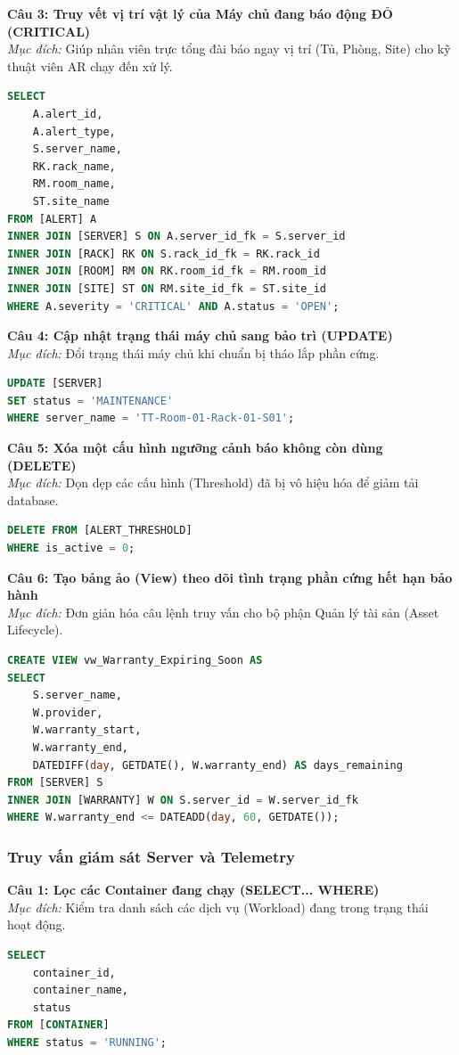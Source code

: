 \noindent \textbf{Câu 3: Truy vết vị trí vật lý của Máy chủ đang báo động ĐỎ (CRITICAL)} \\
\textit{Mục đích:} Giúp nhân viên trực tổng đài báo ngay vị trí (Tủ, Phòng, Site) cho kỹ thuật viên AR chạy đến xử lý.
\begin{lstlisting}[language=SQL]
SELECT
    A.alert_id,
    A.alert_type,
    S.server_name,
    RK.rack_name,
    RM.room_name,
    ST.site_name
FROM [ALERT] A
INNER JOIN [SERVER] S ON A.server_id_fk = S.server_id
INNER JOIN [RACK] RK ON S.rack_id_fk = RK.rack_id
INNER JOIN [ROOM] RM ON RK.room_id_fk = RM.room_id
INNER JOIN [SITE] ST ON RM.site_id_fk = ST.site_id
WHERE A.severity = 'CRITICAL' AND A.status = 'OPEN';
\end{lstlisting}

\noindent \textbf{Câu 4: Cập nhật trạng thái máy chủ sang bảo trì (UPDATE)} \\
\textit{Mục đích:} Đổi trạng thái máy chủ khi chuẩn bị tháo lắp phần cứng.
\begin{lstlisting}[language=SQL]
UPDATE [SERVER]
SET status = 'MAINTENANCE'
WHERE server_name = 'TT-Room-01-Rack-01-S01';
\end{lstlisting}

\noindent \textbf{Câu 5: Xóa một cấu hình ngưỡng cảnh báo không còn dùng (DELETE)} \\
\textit{Mục đích:} Dọn dẹp các cấu hình (Threshold) đã bị vô hiệu hóa để giảm tải database.
\begin{lstlisting}[language=SQL]
DELETE FROM [ALERT_THRESHOLD]
WHERE is_active = 0;
\end{lstlisting}

\noindent \textbf{Câu 6: Tạo bảng ảo (View) theo dõi tình trạng phần cứng hết hạn bảo hành} \\
\textit{Mục đích:} Đơn giản hóa câu lệnh truy vấn cho bộ phận Quản lý tài sản (Asset Lifecycle).
\begin{lstlisting}[language=SQL]
CREATE VIEW vw_Warranty_Expiring_Soon AS
SELECT
    S.server_name,
    W.provider,
    W.warranty_start,
    W.warranty_end,
    DATEDIFF(day, GETDATE(), W.warranty_end) AS days_remaining
FROM [SERVER] S
INNER JOIN [WARRANTY] W ON S.server_id = W.server_id_fk
WHERE W.warranty_end <= DATEADD(day, 60, GETDATE());
\end{lstlisting}

\subsubsection{Truy vấn giám sát Server và Telemetry}
\noindent \textbf{Câu 1: Lọc các Container đang chạy (SELECT... WHERE)} \\
\textit{Mục đích:} Kiểm tra danh sách các dịch vụ (Workload) đang trong trạng thái hoạt động.
\begin{lstlisting}[language=SQL]
SELECT
    container_id,
    container_name,
    status
FROM [CONTAINER]
WHERE status = 'RUNNING';
\end{lstlisting}

